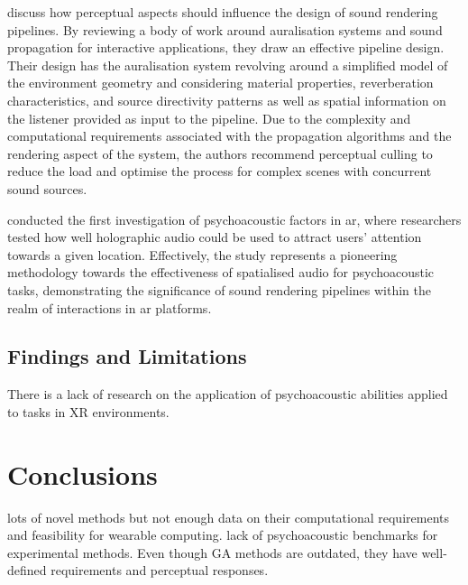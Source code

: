 \cite{hacihabiboglu2017perceptual} discuss how perceptual aspects should influence the design of sound rendering pipelines. By reviewing a body of work around auralisation systems and sound propagation for interactive applications, they draw an effective pipeline design. Their design has the auralisation system revolving around a simplified model of the environment geometry and considering material properties, reverberation characteristics, and source directivity patterns as well as spatial information on the listener provided as input to the pipeline. Due to the complexity and computational requirements associated with the propagation algorithms and the rendering aspect of the system, the authors recommend perceptual culling to reduce the load and optimise the process for complex scenes with concurrent sound sources.\par

\cite{holographic_localisation} conducted the first investigation of psychoacoustic factors in \acrshort{ar}, where researchers tested how well holographic audio could be used to attract users' attention towards a given location. Effectively, the study represents a pioneering methodology towards the effectiveness of spatialised audio for psychoacoustic tasks, demonstrating the significance of sound rendering pipelines within the realm of interactions in \acrshort{ar} platforms.\par

\subsection{Findings and Limitations}
There is a lack of research on the application of psychoacoustic abilities applied to tasks in XR environments.

\section{Conclusions}

lots of novel methods but not enough data on their computational requirements and feasibility for wearable computing.
lack of psychoacoustic benchmarks for experimental methods.
Even though GA methods are outdated, they have well-defined requirements and perceptual responses.

